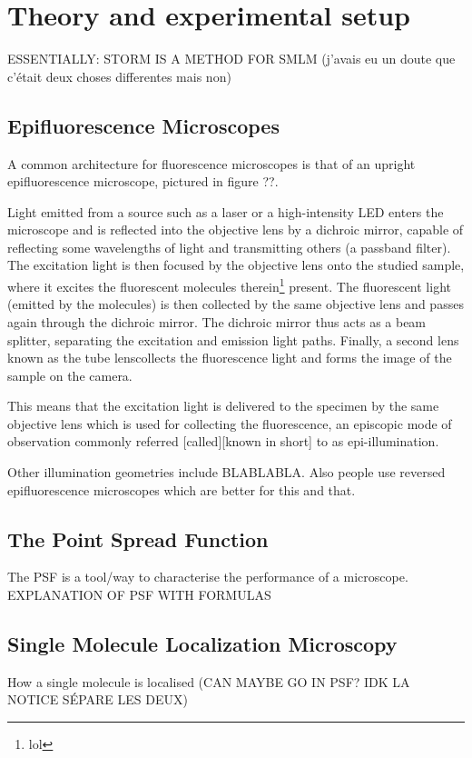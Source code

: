 \section{Theory and experimental setup}
ESSENTIALLY: STORM IS A METHOD FOR SMLM (j'avais eu un doute que c'était deux choses differentes mais non)

\subsection{Epifluorescence Microscopes}
A common architecture for fluorescence microscopes is that of an upright epifluorescence microscope, pictured in figure ??.

Light emitted from a source such as a laser or a high-intensity LED enters the microscope and is reflected into the objective lens by a dichroic mirror, capable of reflecting some wavelengths of light and transmitting others (a passband filter)\cite{douglass_notice_2023}.
The excitation light is then focused by the objective lens onto the studied sample, where it excites the fluorescent molecules therein\footnote{lol} present.
The fluorescent light (emitted by the molecules) is then collected by the same objective lens and passes again through the dichroic mirror.
The dichroic mirror thus acts as a beam splitter, separating the excitation and emission light paths\cite{sachl_introduction_2022}.
Finally, a second lens known as the tube lens\footnotemark collects the fluorescence light and forms the image of the sample on the camera.

This means that the excitation light is delivered to the specimen by the same objective lens which is used for collecting the fluorescence, an episcopic mode of observation commonly referred [called][known in short] to as epi-illumination.

Other illumination geometries include BLABLABLA.
Also people use reversed epifluorescence microscopes which are better for this and that.



\subsection{The Point Spread Function}
The PSF is a tool/way to characterise the performance of a microscope.
EXPLANATION OF PSF WITH FORMULAS


\subsection{Single Molecule Localization Microscopy}
How a single molecule is localised (CAN MAYBE GO IN PSF? IDK LA NOTICE SÉPARE LES DEUX)

